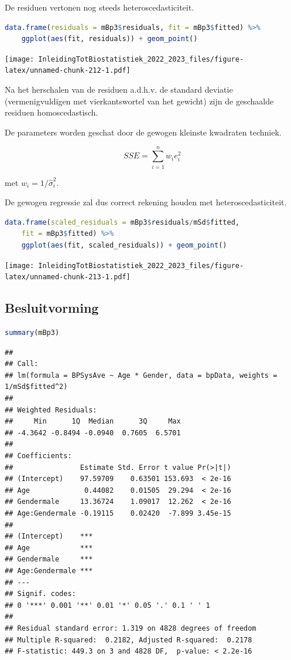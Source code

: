 \documentclass[
  12pt,dutch,coursenotes]{book}
\begin{document}
De residuen vertonen nog steeds heteroscedasticiteit.

\begin{lstlisting}[language=R]
data.frame(residuals = mBp3$residuals, fit = mBp3$fitted) %>%
    ggplot(aes(fit, residuals)) + geom_point()
\end{lstlisting}

\texttt{[image: InleidingTotBiostatistiek\_2022\_2023\_files/figure-latex/unnamed-chunk-212-1.pdf]}

Na het herschalen van de residuen a.d.h.v. de standard deviatie (vermenigvuldigen met vierkantswortel van het gewicht) zijn de geschaalde residuen homoscedastisch.

De parameters worden geschat door de gewogen kleinste kwadraten techniek.

\[
SSE = \sum\limits_{i=1}^n w_i e_i^2
\]

met \(w_i = 1/\hat \sigma^2_i\).

De gewogen regressie zal dus correct rekening houden met heteroscedasticiteit.

\begin{lstlisting}[language=R]
data.frame(scaled_residuals = mBp3$residuals/mSd$fitted,
    fit = mBp3$fitted) %>%
    ggplot(aes(fit, scaled_residuals)) + geom_point()
\end{lstlisting}

\texttt{[image: InleidingTotBiostatistiek\_2022\_2023\_files/figure-latex/unnamed-chunk-213-1.pdf]}

\hypertarget{besluitvorming}{%
\subsection{Besluitvorming}\label{besluitvorming}}

\begin{lstlisting}[language=R]
summary(mBp3)
\end{lstlisting}

\begin{lstlisting}
## 
## Call:
## lm(formula = BPSysAve ~ Age * Gender, data = bpData, weights = 1/mSd$fitted^2)
## 
## Weighted Residuals:
##     Min      1Q  Median      3Q     Max 
## -4.3642 -0.8494 -0.0940  0.7605  6.5701 
## 
## Coefficients:
##                Estimate Std. Error t value Pr(>|t|)
## (Intercept)    97.59709    0.63501 153.693  < 2e-16
## Age             0.44082    0.01505  29.294  < 2e-16
## Gendermale     13.36724    1.09017  12.262  < 2e-16
## Age:Gendermale -0.19115    0.02420  -7.899 3.45e-15
##                   
## (Intercept)    ***
## Age            ***
## Gendermale     ***
## Age:Gendermale ***
## ---
## Signif. codes:  
## 0 '***' 0.001 '**' 0.01 '*' 0.05 '.' 0.1 ' ' 1
## 
## Residual standard error: 1.319 on 4828 degrees of freedom
## Multiple R-squared:  0.2182, Adjusted R-squared:  0.2178 
## F-statistic: 449.3 on 3 and 4828 DF,  p-value: < 2.2e-16
\end{lstlisting}
\end{document}
